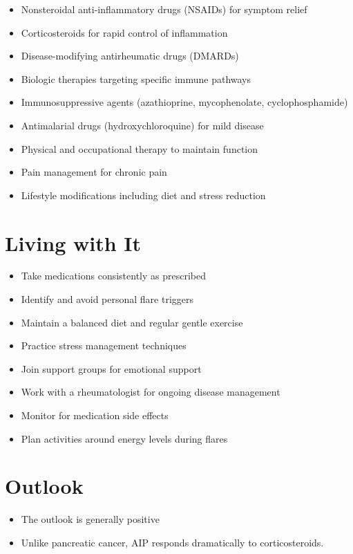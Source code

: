 \begin{itemize}[noitemsep]
  \item Nonsteroidal anti-inflammatory drugs (NSAIDs) for symptom relief
  \item Corticosteroids for rapid control of inflammation
  \item Disease-modifying antirheumatic drugs (DMARDs)
  \item Biologic therapies targeting specific immune pathways
  \item Immunosuppressive agents (azathioprine, mycophenolate, cyclophosphamide)
  \item Antimalarial drugs (hydroxychloroquine) for mild disease
  \item Physical and occupational therapy to maintain function
  \item Pain management for chronic pain
  \item Lifestyle modifications including diet and stress reduction
\end{itemize}
\section{Living with It}
\begin{itemize}[noitemsep]
  \item Take medications consistently as prescribed
  \item Identify and avoid personal flare triggers
  \item Maintain a balanced diet and regular gentle exercise
  \item Practice stress management techniques
  \item Join support groups for emotional support
  \item Work with a rheumatologist for ongoing disease management
  \item Monitor for medication side effects
  \item Plan activities around energy levels during flares
\end{itemize}
\section{Outlook}
\begin{itemize}[noitemsep]
  \item The outlook is generally positive
  \item Unlike pancreatic cancer, AIP responds dramatically to corticosteroids.
\end{itemize}
